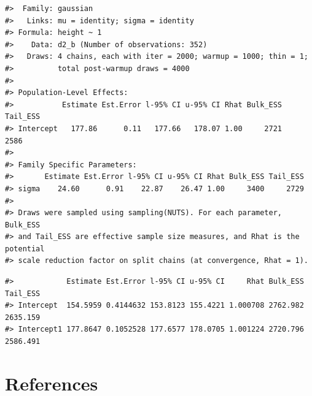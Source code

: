 \documentclass[
  letterpaper,
  DIV=11,
  numbers=noendperiod]{scrreprt}
\newenvironment{Shaded}{\begin{snugshade}}{\end{snugshade}}
\newcommand{\CommentTok}[1]{\textcolor[rgb]{0.37,0.37,0.37}{#1}}
\newcommand{\FloatTok}[1]{\textcolor[rgb]{0.68,0.00,0.00}{#1}}
\newcommand{\FunctionTok}[1]{\textcolor[rgb]{0.28,0.35,0.67}{#1}}
\newcommand{\InformationTok}[1]{\textcolor[rgb]{0.37,0.37,0.37}{#1}}
\newcommand{\NormalTok}[1]{\textcolor[rgb]{0.00,0.23,0.31}{#1}}
\newcommand{\SpecialCharTok}[1]{\textcolor[rgb]{0.37,0.37,0.37}{#1}}
\newlength{\cslhangindent}
\newlength{\cslentryspacingunit} %
\newenvironment{CSLReferences}[2] %
 {%
  \setlength{\parindent}{0pt}
  \ifodd #1
  \let\oldpar\par
  \def\par{\hangindent=\cslhangindent\oldpar}
  \fi
  \setlength{\parskip}{#2\cslentryspacingunit}
 }%
 {}
\begin{document}
\begin{verbatim}
#>  Family: gaussian 
#>   Links: mu = identity; sigma = identity 
#> Formula: height ~ 1 
#>    Data: d2_b (Number of observations: 352) 
#>   Draws: 4 chains, each with iter = 2000; warmup = 1000; thin = 1;
#>          total post-warmup draws = 4000
#> 
#> Population-Level Effects: 
#>           Estimate Est.Error l-95% CI u-95% CI Rhat Bulk_ESS Tail_ESS
#> Intercept   177.86      0.11   177.66   178.07 1.00     2721     2586
#> 
#> Family Specific Parameters: 
#>       Estimate Est.Error l-95% CI u-95% CI Rhat Bulk_ESS Tail_ESS
#> sigma    24.60      0.91    22.87    26.47 1.00     3400     2729
#> 
#> Draws were sampled using sampling(NUTS). For each parameter, Bulk_ESS
#> and Tail_ESS are effective sample size measures, and Rhat is the potential
#> scale reduction factor on split chains (at convergence, Rhat = 1).
\end{verbatim}

\begin{Shaded}
\end{Shaded}

\begin{verbatim}
#>            Estimate Est.Error l-95% CI u-95% CI     Rhat Bulk_ESS Tail_ESS
#> Intercept  154.5959 0.4144632 153.8123 155.4221 1.000708 2762.982 2635.159
#> Intercept1 177.8647 0.1052528 177.6577 178.0705 1.001224 2720.796 2586.491
\end{verbatim}


\hypertarget{references}{%
\chapter*{References}\label{references}}


\hypertarget{refs}{}
\begin{CSLReferences}{0}{0}
\end{CSLReferences}
\end{document}
